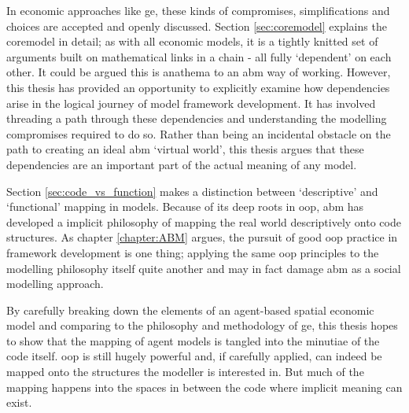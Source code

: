 In economic approaches like \gls{ge}, these kinds of compromises, simplifications and choices are accepted and openly discussed. Section \ref{sec:coremodel} explains the \gls{coremodel} in detail; as with all economic models, it is a tightly knitted set of arguments built on mathematical links in a chain - all fully `dependent' on each other. It could be argued this is anathema to an \gls{abm} way of working. However, this thesis has provided an opportunity to explicitly examine how dependencies arise in the logical journey of model framework development. It has involved threading a path through these dependencies and understanding the modelling compromises required to do so. Rather than being an incidental obstacle on the path to creating an ideal \gls{abm} `virtual world', this thesis argues that these dependencies are an important part of the actual meaning of any model. 

Section \ref{sec:code_vs_function} makes a distinction between `descriptive' and `functional' mapping in models. Because of its deep roots in \gls{oop}, \gls{abm} has developed a implicit philosophy of mapping the real world descriptively onto code structures. As chapter \ref{chapter:ABM} argues, the pursuit of good \gls{oop} practice in framework development is one thing; applying the same \gls{oop} principles to the modelling philosophy itself quite another and may in fact damage \gls{abm} as a social modelling approach.

By carefully breaking down the elements of an agent-based spatial economic model and comparing to the philosophy and methodology of \gls{ge}, this thesis hopes to show that the mapping of agent models is tangled into the minutiae of the code itself. \gls{oop} is still hugely powerful and, if carefully applied, can indeed be mapped onto the structures the modeller is interested in. But much of the mapping happens into the spaces in between the code where implicit meaning can exist.

